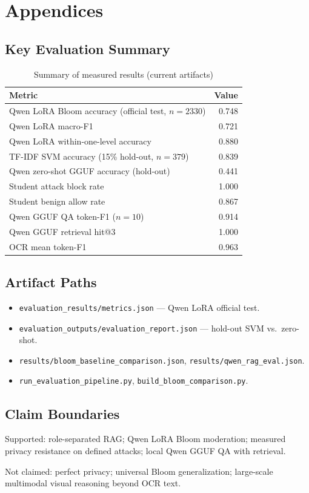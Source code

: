 \chapter{Appendices}

\section{Key Evaluation Summary}

\begin{table}[H]
\centering
\small
\caption{Summary of measured results (current artifacts)}
\label{tab:appendix_key_results}
\begin{tabular}{@{}p{}r@{}}
\toprule
\textbf{Metric} & \textbf{Value}\\
\midrule
Qwen LoRA Bloom accuracy (official test, $n{=}2330$) & 0.748\\
Qwen LoRA macro-F1 & 0.721\\
Qwen LoRA within-one-level accuracy & 0.880\\
TF-IDF SVM accuracy (15\% hold-out, $n{=}379$) & 0.839\\
Qwen zero-shot GGUF accuracy (hold-out) & 0.441\\
Student attack block rate & 1.000\\
Student benign allow rate & 0.867\\
Qwen GGUF QA token-F1 ($n{=}10$) & 0.914\\
Qwen GGUF retrieval hit@3 & 1.000\\
OCR mean token-F1 & 0.963\\
\bottomrule
\end{tabular}
\end{table}

\section{Artifact Paths}

\begin{itemize}
    \item \texttt{evaluation\_results/metrics.json} --- Qwen LoRA official test.
    \item \texttt{evaluation\_outputs/evaluation\_report.json} --- hold-out SVM vs.\ zero-shot.
    \item \texttt{results/bloom\_baseline\_comparison.json}, \texttt{results/qwen\_rag\_eval.json}.
    \item \texttt{run\_evaluation\_pipeline.py}, \texttt{build\_bloom\_comparison.py}.
\end{itemize}

\section{Claim Boundaries}

Supported: role-separated RAG; Qwen LoRA Bloom moderation; measured privacy resistance on defined attacks; local Qwen GGUF QA with retrieval.

Not claimed: perfect privacy; universal Bloom generalization; large-scale multimodal visual reasoning beyond OCR text.
